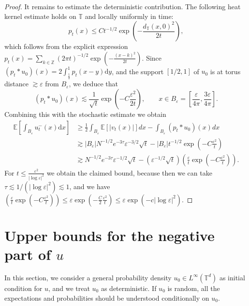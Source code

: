 \documentclass[a4paper,12pt]{article}
\newcommand{\mathd}{\mathrm{d}}
\newcommand{\T}{\mathbb{T}}
\newcommand{\Z}{\mathbb{Z}}
\begin{document}
\begin{proof}
It remains to estimate the deterministic contribution. The following heat kernel estimate holds on $\mathbb{T}$ and locally uniformly in time:
\begin{equation}\label{heat_estimate}
    p_t(x) \leq C t^{-1/2} \exp \left(-\frac{d_{\mathbb{T}}(x,0)^2}{2t}\right),
\end{equation}
which follows from the explicit expression $p_t(x) = \sum_{k \in \Z} (2\pi t)^{-1/2} \exp\left(-\frac{(x-k)^2}{2t}\right)$.
Since $(p_t \ast u_0)(x) = 2 \int_{\frac12}^1p_t(x-y)\mathd y$, and  the support $[1/2,1]$ of $u_0$ is at torus distance
$\gtrsim \varepsilon$ from $B_\varepsilon$, we deduce that
\begin{equation*}
    (p_t \ast u_0) (x) \lesssim \frac{1}{\sqrt{t}}\exp \left( - C\frac{\varepsilon^2}{2t}\right), \qquad x \in B_\varepsilon = \left[\frac{\varepsilon}{4 \pi}, \frac{3 \varepsilon}{4 \pi}\right].
\end{equation*}
Combining this with the stochastic estimate we obtain
\begin{align*}
\mathbb{E}\left[\int_{B_\varepsilon}u_t^-(x)\mathd x\right] &\geq \frac{1}{2}\int_{B_\varepsilon} \mathbb{E}[|v_t(x)|]dx - \int_{B_\varepsilon} (p_t \ast u_0)(x) dx \\
    &\gtrsim |B_\varepsilon| N^{-1/2} e^{-3\tau}\varepsilon^{-3/2}\sqrt{t}    - |B_\varepsilon| t^{-1/2} \exp(-C \frac{\varepsilon^2}{t}) \\
    &\gtrsim N^{-1/2} e^{-3\tau} \varepsilon^{-1/2} \sqrt{t}   -(\varepsilon^{-1/2} \sqrt{t}) (\frac{\varepsilon}{t} \exp(-C \frac{\varepsilon^2}{t})).
\end{align*}
For 
$ 
t \leq \frac{\varepsilon^2}{|\log \varepsilon|^2}
$ 
we obtain the claimed bound, because then we can take $\tau \lesssim 1/(|\log \varepsilon|^2) \lesssim 1$, and we have $(\frac{\varepsilon}{t} \exp(-C \frac{\varepsilon^2}{t})) \leq \varepsilon \exp(-\tfrac{C}{2}\frac{\varepsilon^2}{t}) \leq \varepsilon \exp(-c|\log\varepsilon|^2)$.
\end{proof}



\section{Upper bounds for the negative part of $u$}\label{sec:negative}

In this section, we consider a general probability density $u_0 \in L^\infty(\T^d)$ as initial condition for $u$, and we treat $u_0$ as deterministic.
If $u_0$ is random, all the expectations and probabilities should be understood conditionally on $u_0$.
\end{document}
